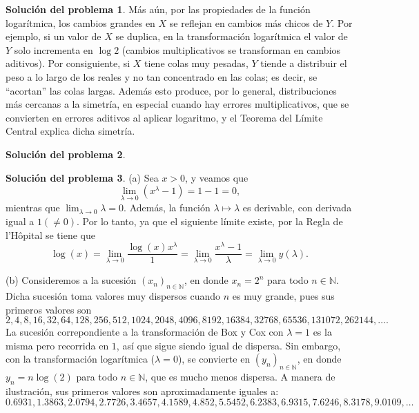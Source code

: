 \documentclass[twoside,12pt]{article}
\theoremstyle{definition}
\newtheorem{soln}{Solución del problema}
\newcommand{\NN}{\mathbb{N}}
\begin{document}
\begin{soln}
Más aún, por las propiedades de la función logarítmica, los cambios grandes en $X$ se reflejan en cambios más chicos de $Y$. Por ejemplo, si un valor de $X$ se duplica, en la transformación logarítmica el valor de $Y$ solo incrementa en $\log 2$ (cambios multiplicativos se transforman en cambios aditivos). Por consiguiente, si $X$ tiene colas muy pesadas, $Y$ tiende a distribuir el peso a lo largo de los reales y no tan concentrado en las colas; es decir, se ``acortan'' las colas largas. Además esto produce, por lo general, distribuciones más cercanas a la simetría, en especial cuando hay errores multiplicativos, que se convierten en errores aditivos al aplicar logaritmo, y el Teorema del Límite Central explica dicha simetría.
\end{soln}

\newpage
\begin{soln}

\end{soln}

\newpage
\begin{soln}
(a) Sea $x>0$, y veamos que
\[
\lim_{\lambda\to 0} (x^{\lambda}-1) = 1-1=0,
\]
mientras que $\lim_{\lambda\to 0} \lambda = 0$. Además, la función $\lambda \mapsto \lambda$ es derivable, con derivada igual a $1(\neq 0)$. Por lo tanto, ya que el siguiente límite existe, por la Regla de l'Hôpital se tiene que
\[
\log(x) = \lim_{\lambda\to 0} \frac{\log(x) x^\lambda}{1} = \lim_{\lambda\to 0} \frac{x^{\lambda}-1}{\lambda}=\lim_{\lambda\to 0} y(\lambda).
\]

(b) Consideremos a la sucesión ${(x_n)}_{n\in\NN}$, en donde $x_n = 2^n$ para todo $n\in\NN$. Dicha sucesión toma valores muy dispersos cuando $n$ es muy grande, pues sus primeros valores son
\[
2, 4, 8, 16, 32, 64, 128, 256, 512, 1024, 2048, 4096, 8192, 16384, 32768, 65536, 131072, 262144, \ldots.
\]
La sucesión correpondiente a la transformación de Box y Cox con $\lambda=1$ es la misma pero recorrida en $1$, así que sigue siendo igual de dispersa. Sin embargo, con la transformación logarítmica ($\lambda=0$), se convierte en ${(y_n)}_{n\in\NN}$, en donde $y_n = n\log(2)$ para todo $n\in\NN$, que es mucho menos dispersa. A manera de ilustración, sus primeros valores son aproximadamente iguales a:
\[
0.6931, 1.3863, 2.0794, 2.7726, 3.4657, 4.1589, 4.852, 5.5452, 6.2383, 6.9315, 7.6246, 8.3178, 9.0109, \ldots
\]
\end{soln}
\end{document}
